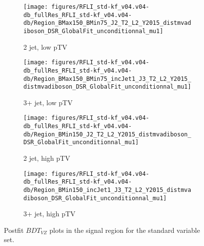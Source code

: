 \begin{figure}[!htbp]\captionsetup{justification=centering}
    \centering
\begin{subfigure}[t]{0.45000\textwidth}\centering\texttt{[image: figures/RFLI\_std-kf\_v04.v04-db\_fullRes\_RFLI\_std-kf\_v04.v04-db/Region\_BMax150\_BMin75\_J2\_T2\_L2\_Y2015\_distmvadiboson\_DSR\_GlobalFit\_unconditionnal\_mu1]}\caption{2 jet, low pTV}\end{subfigure}
\begin{subfigure}[t]{0.45000\textwidth}\centering\texttt{[image: figures/RFLI\_std-kf\_v04.v04-db\_fullRes\_RFLI\_std-kf\_v04.v04-db/Region\_BMax150\_BMin75\_incJet1\_J3\_T2\_L2\_Y2015\_distmvadiboson\_DSR\_GlobalFit\_unconditionnal\_mu1]}\caption{3+ jet, low pTV}\end{subfigure}
\begin{subfigure}[t]{0.45000\textwidth}\centering\texttt{[image: figures/RFLI\_std-kf\_v04.v04-db\_fullRes\_RFLI\_std-kf\_v04.v04-db/Region\_BMin150\_J2\_T2\_L2\_Y2015\_distmvadiboson\_DSR\_GlobalFit\_unconditionnal\_mu1]}\caption{2 jet, high pTV}\end{subfigure}
\begin{subfigure}[t]{0.45000\textwidth}\centering\texttt{[image: figures/RFLI\_std-kf\_v04.v04-db\_fullRes\_RFLI\_std-kf\_v04.v04-db/Region\_BMin150\_incJet1\_J3\_T2\_L2\_Y2015\_distmvadiboson\_DSR\_GlobalFit\_unconditionnal\_mu1]}\caption{3+ jet, high pTV}\end{subfigure}
  \caption{Postfit $BDT_{VZ}$ plots in the signal region for the standard variable set.}
  \label{fig:stdPostfitmvavz}
\end{figure}

